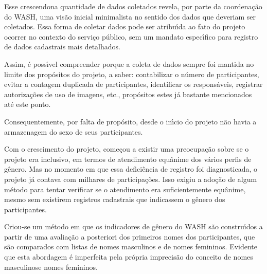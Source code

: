 \documentclass[
12pt,		%
openright,	%
twoside,  %
a4paper,			%
chapter=TITLE,		%
english,			%
french,				%
spanish,			%
brazil				%
]{USPSC-classe/USPSC}
\begin{document}
Esse \textquotedbl crescendo\textquotedbl  na quantidade de dados coletados revela, por parte da coordena\c{c}\~ao do WASH, uma vis\~ao inicial minimalista no sentido dos dados que deveriam ser coletados. Essa forma de coletar dados pode ser atribu\'{\i}da ao fato do projeto ocorrer no contexto do servi\c{c}o p\'ublico, sem um mandato espec\'{\i}fico para registro de dados cadastrais mais detalhados.










Assim, \'e poss\'{\i}vel compreender porque a coleta de dados sempre foi mantida no limite dos prop\'ositos do projeto, a saber: contabilizar o n\'umero de participantes, evitar a contagem duplicada de participantes, identificar os respons\'aveis, registrar autoriza\c{c}\~oes de uso de imagens, etc., prop\'ositos estes j\'a bastante mencionados at\'e este ponto.










Consequentemente, por falta de prop\'osito, desde o in\'{\i}cio do projeto n\~ao havia a armazenagem do sexo de seus participantes.










Com o crescimento do projeto, come\c{c}ou a existir uma preocupa\c{c}\~ao sobre se o projeto era inclusivo, em termos de atendimento equ\^anime dos v\'arios perfis de g\^enero. Mas no momento em que essa defici\^encia de registro foi diagnosticada, o projeto j\'a contava com milhares de participa\c{c}\~oes. Isso exigiu a ado\c{c}\~ao de algum m\'etodo para tentar verificar se o atendimento era suficientemente equ\^anime, mesmo sem existirem registros cadastrais que indicassem o g\^enero dos participantes.










Criou-se um m\'etodo em que os indicadores de g\^enero do WASH s\~ao constru\'{\i}dos a partir de uma avalia\c{c}\~ao a posteriori dos primeiros nomes dos participantes, que s\~ao comparados com listas de nomes masculinos e de nomes femininos. Evidente que esta abordagem \'e imperfeita pela pr\'opria imprecis\~ao do conceito de \textquotedbl nomes masculinos\textquotedbl  e \textquotedbl nomes femininos\textquotedbl .
\end{document}
